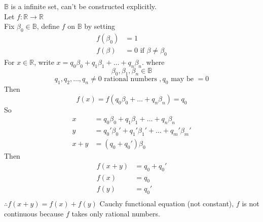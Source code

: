 \documentclass[10pt,letterpaper]{article}
\begin{document}
	$\mathbb{B}$ is a infinite set, can't be constructed explicitly. \\
	Let $f: \mathbb{R} \rightarrow \mathbb{R}$ \\
	Fix $\beta_0 \in \mathbb{B}$, define $f$ on $\mathbb{B}$ by setting
	\begin{align*}
	f(\beta_0) &= 1 \\
	f(\beta) &= 0   \text{ if } \beta \neq \beta_0
	\end{align*}
	For $x \in \mathbb{R}$, write $x = q_0\beta_0 + q_1\beta_1 + \ldots + q_n\beta_n$.
	where
	$$\beta_0, \beta_1, \beta_n \in \mathbb{B}$$
	$$q_1, q_2, \ldots, q_n \neq 0 \text{ rational numbers }, q_0 \text{ may be } = 0$$
	Then
	$$f(x) = f(q_0\beta_0 + \ldots + q_n\beta_n) = q_0$$ 
	So
\begin{align*}
	x &= q_0\beta_0 + q_1\beta_1 + \ldots + q_n\beta_n \\
	y &= q_0'\beta_0' + q_1'\beta_1' + \ldots + q_m'\beta_m' \\
	x + y &= (q_0 + q_0')\beta_0 
\end{align*}
	Then
\begin{align*}
	f(x + y) &= q_0 + q_0' \\
	f(x) &= q_0 \\
	f(y) &= q_0' \\ 
\end{align*}	
	$\therefore f(x + y) = f(x) + f(y)$ Cauchy functional equation (not constant),
	$f$ is not continuous because $f$ takes only rational numbers. \\
	
\end{document}
